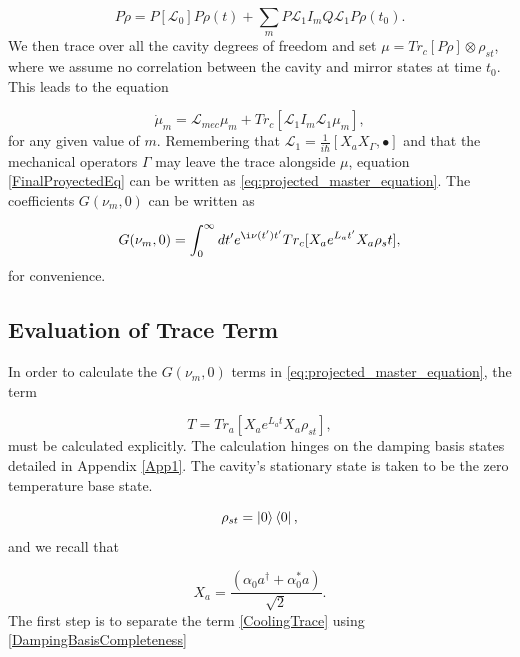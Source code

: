 \documentclass[reprint, amsmath,amssymb, aps,pra]{revtex4-1}
\begin{document}
\begin{equation}
P\dot{\rho} = P[\mathcal{L}_0]P \rho(t) + \sum_{m} P \mathcal{L}_1 I_{m} Q \mathcal{L}_1 P \rho(t_0).
\end{equation} We then trace over all the cavity degrees of freedom and set  $\mu = Tr_c[P\rho]\otimes \rho_{st}$, where we assume no correlation between the cavity and mirror states at time $t_0$. This leads to the equation

\begin{equation}\label{FinalProyectedEq}
\dot{\mu}_m = \mathcal{L}_{mec}\mu_m + Tr_c[ \mathcal{L}_1 I_m \mathcal{L}_1  \mu_m],
\end{equation} for any given value of $m$. Remembering that $\mathcal{L}_1 = \frac{1}{i\hbar}[X_a X_\Gamma,\bullet]$ and that the mechanical operators $\Gamma$ may leave the trace alongside $\mu$, equation \eqref{FinalProyectedEq} can be written as \eqref{eq:projected_master_equation}. The coefficients $G(\nu_m,0)$ can be written as

\begin{equation}\label{GAppendix}
G(\nu_m,0)=\int_0^\infty dt' e^{\i\nu(t')t'}Tr_c[X_a e^{L_a t'} X_a \rho_st], 
\end{equation} for convenience.




\subsection{Evaluation of Trace Term}\label{TraceAppendix}

In order to calculate the $G(\nu_m,0)$ terms in \eqref{eq:projected_master_equation}, the term

\begin{equation}\label{CoolingTrace}
T=Tr_a[X_ae^{L_at}X_a\rho_{st}],
\end{equation} must be calculated explicitly. The calculation hinges on the damping basis states detailed in Appendix \ref{App1}. The cavity's stationary state is taken to be the zero temperature base state.

\begin{equation}
\rho_{st} = \Ket{0}\Bra{0},
\end{equation} and we recall that

\begin{equation}
X_a = \frac{(\alpha_0a^{\dagger}+\alpha_0^*a)}{\sqrt{2}}.
\end{equation} The first step is to separate the term \eqref{CoolingTrace} using \eqref{DampingBasisCompleteness}
\end{document}
